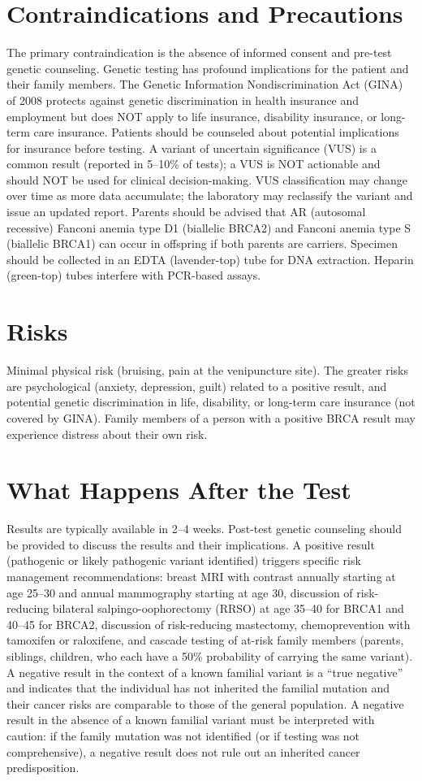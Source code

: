 \section*{Contraindications and Precautions}
The primary contraindication is the absence of informed consent and pre-test genetic counseling. Genetic testing has profound implications for the patient and their family members. The Genetic Information Nondiscrimination Act (GINA) of 2008 protects against genetic discrimination in health insurance and employment but does NOT apply to life insurance, disability insurance, or long-term care insurance. Patients should be counseled about potential implications for insurance before testing. A variant of uncertain significance (VUS) is a common result (reported in 5--10\% of tests); a VUS is NOT actionable and should NOT be used for clinical decision-making. VUS classification may change over time as more data accumulate; the laboratory may reclassify the variant and issue an updated report. Parents should be advised that AR (autosomal recessive) Fanconi anemia type D1 (biallelic BRCA2) and Fanconi anemia type S (biallelic BRCA1) can occur in offspring if both parents are carriers. Specimen should be collected in an EDTA (lavender-top) tube for DNA extraction. Heparin (green-top) tubes interfere with PCR-based assays.

\section*{Risks}
Minimal physical risk (bruising, pain at the venipuncture site). The greater risks are psychological (anxiety, depression, guilt) related to a positive result, and potential genetic discrimination in life, disability, or long-term care insurance (not covered by GINA). Family members of a person with a positive BRCA result may experience distress about their own risk.

\section*{What Happens After the Test}
Results are typically available in 2--4 weeks. Post-test genetic counseling should be provided to discuss the results and their implications. A positive result (pathogenic or likely pathogenic variant identified) triggers specific risk management recommendations: breast MRI with contrast annually starting at age 25--30 and annual mammography starting at age 30, discussion of risk-reducing bilateral salpingo-oophorectomy (RRSO) at age 35--40 for BRCA1 and 40--45 for BRCA2, discussion of risk-reducing mastectomy, chemoprevention with tamoxifen or raloxifene, and cascade testing of at-risk family members (parents, siblings, children, who each have a 50\% probability of carrying the same variant). A negative result in the context of a known familial variant is a ``true negative'' and indicates that the individual has not inherited the familial mutation and their cancer risks are comparable to those of the general population. A negative result in the absence of a known familial variant must be interpreted with caution: if the family mutation was not identified (or if testing was not comprehensive), a negative result does not rule out an inherited cancer predisposition.


